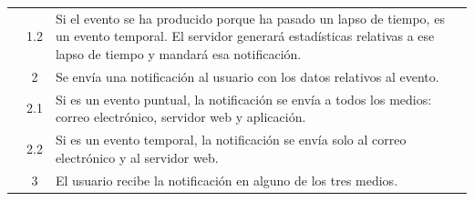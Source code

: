 \begin{table}[H]
\begin{tabularx}{\textwidth}{|c|c|X|}
    \cline{2-3}
                                                & 1.2                                                                                                                                                                     & \multicolumn{1}{L|}{Si el evento se ha producido porque ha pasado un lapso de tiempo, es un evento temporal. El servidor generará estadísticas relativas a ese lapso de tiempo y mandará esa notificación.}                                                   \\
    \cline{2-3}
                                                & 2                                                                                                                                                                       & \multicolumn{1}{L|}{Se envía una notificación al usuario con los datos relativos al evento.}                                                                                                                                                                  \\
    \cline{2-3}
                                                & 2.1                                                                                                                                                                     & \multicolumn{1}{L|}{Si es un evento puntual, la notificación se envía a todos los medios: correo electrónico, servidor web y aplicación.}                                                                                                                     \\
    \cline{2-3}
                                                & 2.2                                                                                                                                                                     & \multicolumn{1}{L|}{Si es un evento temporal, la notificación se envía solo al correo electrónico y al servidor web.}                                                                                                                                         \\
    \cline{2-3}
                                                & 3                                                                                                                                                                       & \multicolumn{1}{L|}{El usuario recibe la notificación en alguno de los tres medios.}                                                                                                                                                                          \\
    \hline
  \end{tabularx}
\end{table}

